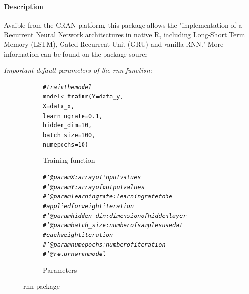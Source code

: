 \documentclass[letter,8pt]{article}\usepackage[]{graphicx}\usepackage[]{color}
\makeatletter
\newcommand{\hlnum}[1]{\textcolor[rgb]{0.686,0.059,0.569}{#1}}%
\newcommand{\hlcom}[1]{\textcolor[rgb]{0.678,0.584,0.686}{\textit{#1}}}%
\newcommand{\hlstd}[1]{\textcolor[rgb]{0.345,0.345,0.345}{#1}}%
\newcommand{\hlkwb}[1]{\textcolor[rgb]{0.69,0.353,0.396}{#1}}%
\newcommand{\hlkwc}[1]{\textcolor[rgb]{0.333,0.667,0.333}{#1}}%
\newcommand{\hlkwd}[1]{\textcolor[rgb]{0.737,0.353,0.396}{\textbf{#1}}}%
\newenvironment{kframe}{%
 \def\at@end@of@kframe{}%
 \ifinner\ifhmode%
  \def\at@end@of@kframe{\end{minipage}}%
  \begin{minipage}{\columnwidth}%
 \fi\fi%
 \def\FrameCommand##1{\hskip\@totalleftmargin \hskip-\fboxsep
 \colorbox{shadecolor}{##1}\hskip-\fboxsep
     \hskip-\linewidth \hskip-\@totalleftmargin \hskip\columnwidth}%
 \MakeFramed {\advance\hsize-\width
   \@totalleftmargin\z@ \linewidth\hsize
   \@setminipage}}%
 {\par\unskip\endMakeFramed%
 \at@end@of@kframe}
\newenvironment{knitrout}{}{} %
\makeatother
\begin{document}
\paragraph{Description}
Avaible from the CRAN platform, this package allows the "implementation of a Recurrent Neural Network architectures in native R, including Long-Short Term Memory (LSTM), Gated Recurrent Unit (GRU) and vanilla RNN." More information can be found on the package source \cite{rnn2019}

\textit{Important default parameters of the rnn function:}

\begin{figure}[H]
  \begin{subfigure}{0.5\textwidth}
\begin{knitrout}
\color{fgcolor}\begin{kframe}
\begin{alltt}
\hlcom{# train the model}
\hlstd{model} \hlkwb{<-} \hlkwd{trainr}\hlstd{(}\hlkwc{Y}\hlstd{=data_y,}
                \hlkwc{X}\hlstd{=data_x,}
                \hlkwc{learningrate} \hlstd{=} \hlnum{0.1}\hlstd{,}
                \hlkwc{hidden_dim} \hlstd{=} \hlnum{10}\hlstd{,}
                \hlkwc{batch_size} \hlstd{=} \hlnum{100}\hlstd{,}
                \hlkwc{numepochs} \hlstd{=} \hlnum{10}\hlstd{)}
\end{alltt}
\end{kframe}
\end{knitrout}
    \caption{Training function}
  \end{subfigure}
  \begin{subfigure}{0.5\textwidth}
    \centering
\begin{knitrout}
\color{fgcolor}\begin{kframe}
\begin{alltt}
\hlcom{#' @param X : array of input values}
\hlcom{#' @param Y : array of output values}
\hlcom{#' @param learningrate : learning rate to be }
\hlcom{#         applied for weight iteration}
\hlcom{#' @param hidden_dim : dimension of hidden layer }
\hlcom{#' @param batch_size : number of samples used at}
\hlcom{#         each weight iteration}
\hlcom{#' @param numepochs : number of iteration}
\hlcom{#' @return a rnn model}
\end{alltt}
\end{kframe}
\end{knitrout}
    \caption{Parameters}
  \end{subfigure}
    \caption{rnn package}
\end{figure}
\end{document}
